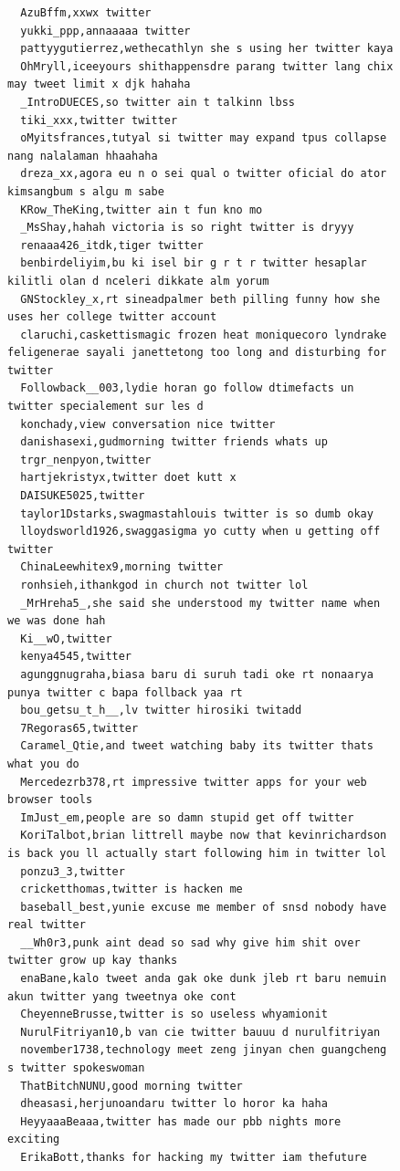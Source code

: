 \begin{figure}[htpb]
\begin{verbatim}
  AzuBffm,xxwx twitter
  yukki_ppp,annaaaaa twitter
  pattyygutierrez,wethecathlyn she s using her twitter kaya
  OhMryll,iceeyours shithappensdre parang twitter lang chix may tweet limit x djk hahaha
  _IntroDUECES,so twitter ain t talkinn lbss
  tiki_xxx,twitter twitter
  oMyitsfrances,tutyal si twitter may expand tpus collapse nang nalalaman hhaahaha
  dreza_xx,agora eu n o sei qual o twitter oficial do ator kimsangbum s algu m sabe
  KRow_TheKing,twitter ain t fun kno mo
  _MsShay,hahah victoria is so right twitter is dryyy
  renaaa426_itdk,tiger twitter
  benbirdeliyim,bu ki isel bir g r t r twitter hesaplar kilitli olan d nceleri dikkate alm yorum
  GNStockley_x,rt sineadpalmer beth pilling funny how she uses her college twitter account
  claruchi,caskettismagic frozen heat moniquecoro lyndrake feligenerae sayali janettetong too long and disturbing for twitter
  Followback__003,lydie horan go follow dtimefacts un twitter specialement sur les d
  konchady,view conversation nice twitter
  danishasexi,gudmorning twitter friends whats up
  trgr_nenpyon,twitter
  hartjekristyx,twitter doet kutt x
  DAISUKE5025,twitter
  taylor1Dstarks,swagmastahlouis twitter is so dumb okay
  lloydsworld1926,swaggasigma yo cutty when u getting off twitter
  ChinaLeewhitex9,morning twitter
  ronhsieh,ithankgod in church not twitter lol
  _MrHreha5_,she said she understood my twitter name when we was done hah
  Ki__wO,twitter
  kenya4545,twitter
  agunggnugraha,biasa baru di suruh tadi oke rt nonaarya punya twitter c bapa follback yaa rt
  bou_getsu_t_h__,lv twitter hirosiki twitadd
  7Regoras65,twitter
  Caramel_Qtie,and tweet watching baby its twitter thats what you do
  Mercedezrb378,rt impressive twitter apps for your web browser tools
  ImJust_em,people are so damn stupid get off twitter
  KoriTalbot,brian littrell maybe now that kevinrichardson is back you ll actually start following him in twitter lol
  ponzu3_3,twitter
  cricketthomas,twitter is hacken me
  baseball_best,yunie excuse me member of snsd nobody have real twitter
  __Wh0r3,punk aint dead so sad why give him shit over twitter grow up kay thanks
  enaBane,kalo tweet anda gak oke dunk jleb rt baru nemuin akun twitter yang tweetnya oke cont
  CheyenneBrusse,twitter is so useless whyamionit
  NurulFitriyan10,b van cie twitter bauuu d nurulfitriyan
  november1738,technology meet zeng jinyan chen guangcheng s twitter spokeswoman
  ThatBitchNUNU,good morning twitter
  dheasasi,herjunoandaru twitter lo horor ka haha
  HeyyaaaBeaaa,twitter has made our pbb nights more exciting
  ErikaBott,thanks for hacking my twitter iam thefuture

\end{verbatim}
\end{figure}
